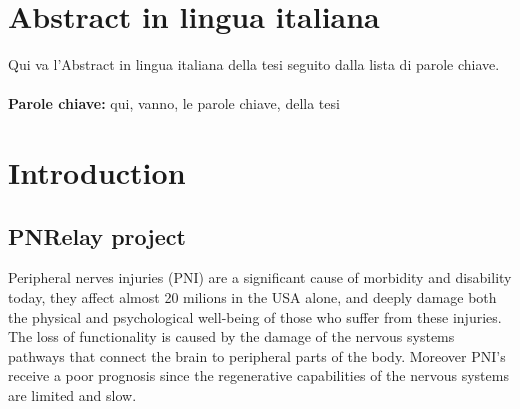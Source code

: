 \documentclass{Configuration_Files/PoliMi3i_thesis}
\begin{document}
\chapter*{Abstract in lingua italiana}
Qui va l'Abstract in lingua italiana della tesi seguito dalla lista di parole chiave.
\\
\\
\textbf{Parole chiave:} qui, vanno, le parole chiave, della tesi %


\thispagestyle{empty}
\tableofcontents %
\thispagestyle{empty}
\cleardoublepage

%
%
%    
%

\mainmatter %

\chapter{Introduction}
\section{PNRelay project}
Peripheral nerves injuries (PNI) are a significant cause of morbidity and disability today,
they affect almost 20 milions in the USA alone, and deeply damage both the physical and psychological well-being of those who suffer from these injuries. \cite{zhangResearchHotspotsTrends2022}
The loss of functionality is caused by the damage of the nervous systems pathways that connect the brain to peripheral parts of the body.
Moreover PNI's receive a poor prognosis since the regenerative capabilities of the nervous systems are limited and slow.
\end{document}
